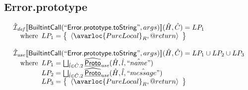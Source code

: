 \subsection{Error.prototype}
\[
\begin{array}{l}

\aI_{\it def}\lbr \SF{BuiltintCall}(``\SF{Error.prototype.toString}",args)\rbr(\hat{H},\hat{C})
  = LP_1\\
\quad\wherec{
  LP_1 = \set{\langle\avarloc{PureLocal}_R,\varprop{return}\rangle}\\
  }\\
\\


\aI_{\it use}\lbr \SF{BuiltintCall}(``\SF{Error.prototype.toString}",args)\rbr(\hat{H},\hat{C})
  = LP_1 \cup LP_2 \cup LP_3\\
\quad\wherec{
  LP_1 = \bigsqcup_{\hat{l} \in \hat{C}.2} \ahf{Proto}_{\it use}(\hat{H}, \hat{l}, \hat{``name"})\\
  LP_2 = \bigsqcup_{\hat{l} \in \hat{C}.2} \ahf{Proto}_{\it use}(\hat{H}, \hat{l}, \hat{``message"})\\
  LP_3 = \set{\langle\avarloc{PureLocal}_R,\varprop{return}\rangle}\\
  }\\
\\

\end{array}
\]

